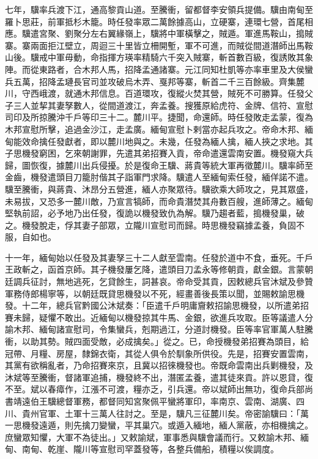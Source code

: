 \begin{pinyinscope}
七年，驥率兵渡下江，通高黎貢山道。至騰衝，留都督李安領兵提備。驥由南甸至羅卜思莊，前軍抵杉木籠。時任發率眾二萬餘據高山，立硬寨，連環七營，首尾相應。驥遣宮聚、劉聚分左右翼緣嶺上，驥將中軍橫擊之，賊遁。軍進馬鞍山，搗賊寨。寨兩面拒江壁立，周迴三十里皆立柵開塹，軍不可進，而賊從間道潛師出馬鞍山後。驥戒中軍毋動，命指揮方瑛率精騎六千突入賊寨，斬首數百級，復誘敗其象陣。而從東路者，合木邦人馬，招降孟通諸寨。元江同知杜凱等亦率車里及大侯蠻兵五萬，招降孟璉長官司並攻破烏木弄、戛邦等寨，斬首二千三百餘級。齊集麓川，守西峨渡，就通木邦信息。百道環攻，復縱火焚其營，賊死不可勝算。任發父子三人並挈其妻孥數人，從間道渡江，奔孟養。搜獲原給虎符、金牌、信符、宣慰司印及所掠騰沖千戶等印三十二。麓川平。捷聞，命還師。時任發敗走孟蒙，復為木邦宣慰所擊，追過金沙江，走孟廣。緬甸宣慰卜剌當亦起兵攻之。帝命木邦、緬甸能效命擒任發獻者，即以麓川地與之。未幾，任發為緬人擒，緬人挾之求地。其子思機發窮困，乞來朝謝罪，先遣其弟招賽入貢，帝命遣還雲南安置。機發窺大兵歸，圖恢復，據麓川出兵侵擾。於是復命王驥、蔣貴等統大軍再徵麓川。驥率師至金齒，機發遣頭目刀籠肘偕其子詣軍門求降。驥遣人至緬甸索任發，緬佯諾不遣。驥至騰衝，與蔣貴、沐昂分五營進，緬人亦聚眾待。驥欲乘大師攻之，見其眾盛，未易拔，又恐多一麓川敵，乃宣言犒師，而命貴潛焚其舟數百艘，進師薄之。緬甸堅執前詔，必予地乃出任發，復詭以機發致仇為解。驥乃趨者藍，搗機發巢，破之。機發脫走，俘其妻子部眾，立隴川宣慰司而歸。時思機發竊據孟養，負固不服，自如也。

十一年，緬甸始以任發及其妻孥三十二人獻至雲南。任發於道中不食，垂死。千戶王政斬之，函首京師。其子機發屢乞降，遣頭目刀孟永等修朝貢，獻金銀。言蒙朝廷調兵征討，無地逃死，乞貸餘生，詞甚哀。帝命受其貢，因敕總兵官沐斌及參贊軍務侍郎楊寧等，以朝廷既貸思機發以不死，經畫善後長策以聞，並賜敕諭思機發。十二年，總兵官黔國公沐斌奏：「臣遣千戶明庸齎敕招諭思機發，以所遣弟招賽未歸，疑懼不敢出。近緬甸以機發掠其牛馬、金銀，欲進兵攻取。臣等議遣人分諭木邦、緬甸諸宣慰司，令集蠻兵，剋期過江，分道討機發。臣等率官軍萬人駐騰衝，以助其勢。賊四面受敵，必成擒矣。」從之。已，命授機發弟招賽為頭目，給冠帶、月糧、房屋，隸錦衣衛，其從人俱令於馴象所供役。先是，招賽安置雲南，其黨有欲稱亂者，乃命招賽來京，且冀以招徠機發也。帝既命雲南出兵剿機發，及沐斌等至騰衝，督諸軍追捕，機發終不出，潛匿孟養，遣其徒來貢。許以恩貸，復不至。斌以春瘴作，江漲不可渡，糧亦乏，引兵還。帝以斌師出無功，復命兵部尚書靖遠伯王驥總督軍務，都督同知宮聚佩平蠻將軍印，率南京、雲南、湖廣、四川、貴州官軍、土軍十三萬人往討之。至是，驥凡三征麓川矣。帝密諭驥曰：「萬一思機發遠遁，則先擒刀變蠻，平其巢穴。或遁入緬地，緬人黨蔽，亦相機擒之。庶蠻眾知懼，大軍不為徒出。」又敕諭斌，軍事悉與驥會議而行。又敕諭木邦、緬甸、南甸、乾崖、隴川等宣慰司罕蓋發等，各整兵備船，積糧以俟調度。


\end{pinyinscope}
